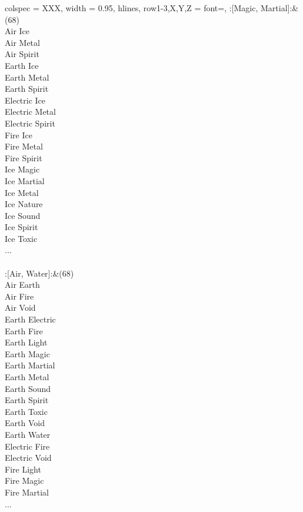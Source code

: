 \begin{longtblr}[
	caption = {2v2 Defending Weak},
	label = {2v2-Defending-Weak},
]{
	colspec = {XXX}, width = 0.95\linewidth,
	hlines,
	row{1-3,X,Y,Z} = {font=\bfseries},
}
	:[Magic, Martial]:&{(68)\\
	Air Ice \\
	Air Metal \\
	Air Spirit \\
	Earth Ice \\
	Earth Metal \\
	Earth Spirit \\
	Electric Ice \\
	Electric Metal \\
	Electric Spirit \\
	Fire Ice \\
	Fire Metal \\
	Fire Spirit \\
	Ice Magic \\
	Ice Martial \\
	Ice Metal \\
	Ice Nature \\
	Ice Sound \\
	Ice Spirit \\
	Ice Toxic \\
	...\\
	}\\

	:[Air, Water]:&{(68)\\
	Air Earth \\
	Air Fire \\
	Air Void \\
	Earth Electric \\
	Earth Fire \\
	Earth Light \\
	Earth Magic \\
	Earth Martial \\
	Earth Metal \\
	Earth Sound \\
	Earth Spirit \\
	Earth Toxic \\
	Earth Void \\
	Earth Water \\
	Electric Fire \\
	Electric Void \\
	Fire Light \\
	Fire Magic \\
	Fire Martial \\
	...\\
	}\\


\end{longtblr}
